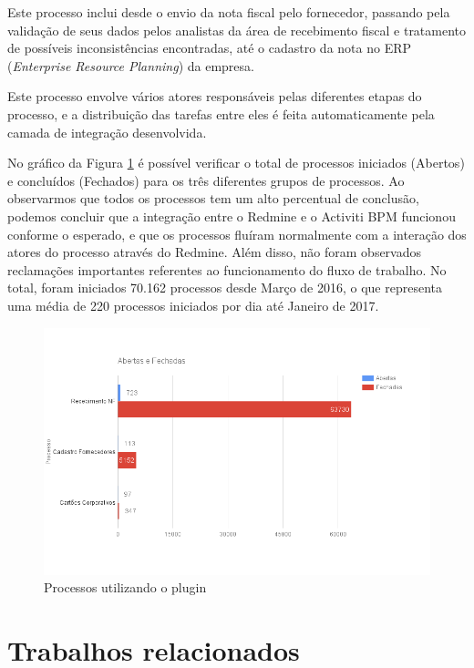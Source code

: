 Este processo inclui desde o envio da nota fiscal pelo fornecedor, passando pela validação de seus dados pelos analistas da área de recebimento fiscal e tratamento de possíveis inconsistências encontradas, até o cadastro da nota no ERP\cite{erp_definition} (\textit{Enterprise Resource Planning}) da empresa. 

Este processo envolve vários atores responsáveis pelas diferentes etapas do processo, e a distribuição das tarefas entre eles é feita automaticamente pela camada de integração desenvolvida.

No gráfico da Figura \ref{fig:grafico_processo} é possível verificar o total de processos iniciados (Abertos) e concluídos (Fechados) para os três diferentes grupos de processos. Ao observarmos que todos os processos tem um alto percentual de conclusão, podemos concluir que a integração entre o Redmine e o Activiti BPM funcionou conforme o esperado, e que os processos fluíram normalmente com a interação dos atores do processo através do Redmine. Além disso, não foram observados reclamações importantes referentes ao funcionamento do fluxo de trabalho. No total, foram iniciados 70.162 processos desde Março de 2016, o que representa uma média de 220 processos iniciados por dia até Janeiro de 2017.

\begin{figure}[H]
\centering
\includegraphics[width=1\textwidth]{imagens/grafico_processo.png}
\caption{Processos utilizando o plugin}
\label{fig:grafico_processo}
\end{figure}

\section{Trabalhos relacionados}\label{sec:resultado-relacionados}

